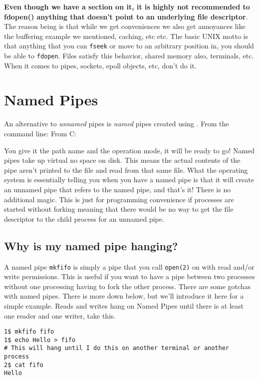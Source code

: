 \textbf{Even though we have a section on it, it is highly not recommended to fdopen() anything that doesn't point to an underlying file descriptor}. The reason being is that while we get conveniences we also get annoyances like the buffering example we mentioned, caching, etc etc.
The basic UNIX motto is that anything that you can \texttt{fseek} or move to an arbitrary position in, you should be able to \texttt{fdopen}. Files satisfy this behavior, shared memory also, terminals, etc.
When it comes to pipes, sockets, epoll objects, etc, don't do it.

\section{Named Pipes}

An alternative to \emph{unnamed} pipes is \emph{named} pipes created using .
From the command line:  From C: 

You give it the path name and the operation mode, it will be ready to go!
Named pipes take up virtual no space on disk.
This means the actual contents of the pipe aren't printed to the file and read from that same file.
What the operating system is essentially telling you when you have a named pipe is that it will create an unnamed pipe that refers to the named pipe, and that's it!
There is no additional magic.
This is just for programming convenience if processes are started without forking meaning that there would be no way to get the file descriptor to the child process for an unnamed pipe.

\subsection{Why is my named pipe hanging?}

A named pipe \texttt{mkfifo} is simply a pipe that you call \texttt{open(2)} on with read and/or write permissions.
This is useful if you want to have a pipe between two processes without one processing having to fork the other process.
There are some gotchas with named pipes.
There is more down below, but we'll introduce it here for a simple example.
Reads and writes hang on Named Pipes until there is at least one reader and one writer, take this.

\begin{verbatim}
1$ mkfifo fifo
1$ echo Hello > fifo
# This will hang until I do this on another terminal or another process
2$ cat fifo
Hello
\end{verbatim}

